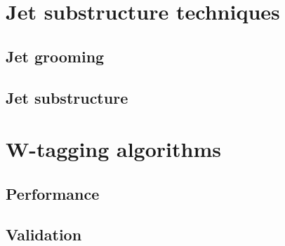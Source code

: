 \section{Jet substructure techniques}
\subsection{Jet grooming}
\subsection{Jet substructure}
\section{W-tagging algorithms}
\subsection{Performance}
\subsection{Validation}